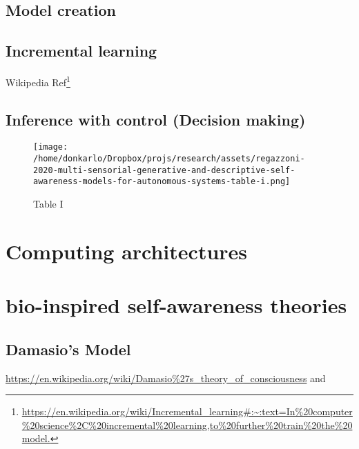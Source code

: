 \documentclass{article}
\begin{document}
		\subsection{Model creation}
			\subsection{Incremental learning}
			Wikipedia Ref\footnote{\url{https://en.wikipedia.org/wiki/Incremental_learning#:~:text=In\%20computer\%20science\%2C\%20incremental\%20learning,to\%20further\%20train\%20the\%20model.}}
			\subsection{}
		\subsection{Inference with control (Decision making)}
	
	\begin{figure*}
		\centering
		\texttt{[image: /home/donkarlo/Dropbox/projs/research/assets/regazzoni-2020-multi-sensorial-generative-and-descriptive-self-awareness-models-for-autonomous-systems-table-i.png]}
		\caption{Table I}
		\label{fig:regazzoni-2020-multi-sensorial-generative-and-descriptive-self-awareness-models-for-autonomous-systems-table-i.jpg}
	\end{figure*}
	\section{Computing architectures}
		\cite{sanz-2009-systems-models-and-self-awareness-towards-architectural-models-of-consciousness}
	\section{bio-inspired self-awareness theories}
		\subsection{Damasio’s Model} \url{https://en.wikipedia.org/wiki/Damasio\%27s_theory_of_consciousness} and \citet{damasio-1999-the-feeling-of-what-happens-body-and-emotion-in-the-making-of-consciousness}
\end{document}
